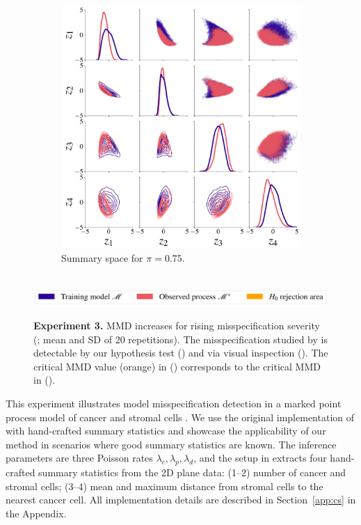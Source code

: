 \documentclass[twoside,11pt]{article}
\newcommand{\numberCS}{3}
\newcommand{\0}{\boldsymbol{0}}
\renewcommand{\cite}[1]{\citep{#1}}
\begin{document}
\begin{figure}[t]
\begin{subfigure}[t]{0.49\linewidth}
        \includegraphics[width=\linewidth]{plots/cs_pairplot.pdf}%
        \caption{Summary space for $\pi=0.75$.}%
        \label{fig:cs-experiment:pairplot}%
    \end{subfigure}\\
    \includegraphics[width=0.8\linewidth]{plots/cs_legend.pdf}
    \caption{\textbf{Experiment \numberCS.} MMD increases for rising misspecification severity (; mean and SD of 20 repetitions). The misspecification studied by \citet{ward_robust_2022} is detectable by our hypothesis test () and via visual inspection ().
    The critical MMD value (orange) in () corresponds to the critical MMD in ().
    }
\end{figure}
This experiment illustrates model misspecification detection in a marked point process model of cancer and stromal cells \cite{jones-todd_identifying_2019}.
We use the original implementation of \citet{ward_robust_2022} with hand-crafted summary statistics and showcase the applicability of our method in scenarios where good summary statistics are known.
The inference parameters are three Poisson rates $\lambda_c, \lambda_p, \lambda_d$, and the setup in \citet{ward_robust_2022} extracts four hand-crafted summary statistics from the 2D plane data: (1--2) number of cancer and stromal cells; (3--4) mean and maximum distance from stromal cells to the nearest cancer cell.
All implementation details are described in Section~\ref{app:cs} in the Appendix.
\end{document}
